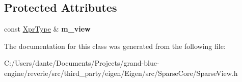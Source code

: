 \subsection*{Protected Attributes}
\begin{DoxyCompactItemize}
\item 
\mbox{\label{class_eigen_1_1internal_1_1unary__evaluator_3_01_sparse_view_3_01_arg_type_01_4_00_01_iterator_based_01_4_1_1_inner_iterator_a26543556900e792d1db906fae70badab}} 
const \mbox{\hyperlink{class_eigen_1_1_sparse_view}{Xpr\+Type}} \& {\bfseries m\+\_\+view}
\end{DoxyCompactItemize}


The documentation for this class was generated from the following file\+:\begin{DoxyCompactItemize}
\item 
C\+:/\+Users/dante/\+Documents/\+Projects/grand-\/blue-\/engine/reverie/src/third\+\_\+party/eigen/\+Eigen/src/\+Sparse\+Core/Sparse\+View.\+h\end{DoxyCompactItemize}
